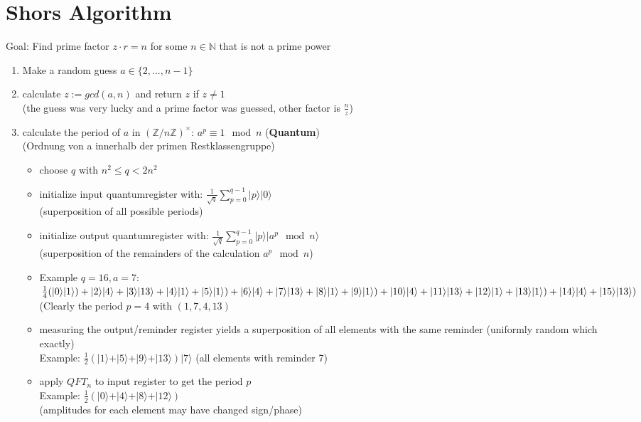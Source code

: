 \documentclass[12pt,a4paper]{article}
\newcommand{\ecb}[1]{\{#1\}}
\newcommand{\ket}[1]{\vert #1 \rangle}
\begin{document}
\section{Shors Algorithm}
Goal: Find prime factor $z \cdot r = n$ for some $n\in\mathbb{N}$ that is not a prime power
\begin{enumerate}
\item Make a random guess $a\in\ecb{2,...,n-1}$
\item calculate $z := gcd(a, n)$ and return $z$ if $z\neq 1$\\(the guess was very lucky and a prime factor was guessed, other factor is $\frac{n}{z}$)
\item calculate the period of $a$ in $(\mathbb{Z}/n\mathbb{Z})^\times$: $a^p \equiv 1 \mod n$ (\textbf{Quantum})\\
(Ordnung von a innerhalb der primen Restklassengruppe)
\begin{itemize}
\item choose $q$ with $n^2 \leq q <2n^2$
\item initialize input quantumregister with: $\displaystyle \frac{1}{\sqrt{q}} \sum_{p=0}^{q-1} \ket{p}\ket{0}$\\
(superposition of all possible periods)
\item initialize output quantumregister with: $\displaystyle \frac{1}{\sqrt{q}} \sum_{p=0}^{q-1} \ket{p}\ket{a^p\mod n}$\\
(superposition of the remainders of the calculation $a^p\mod n$)
\item Example $q=16, a=7$:\\
$\frac{1}{4}(\ket{0}\ket{1})+\ket{2}\ket{4}+\ket{3}\ket{13}+\\
\ket{4}\ket{1}+\ket{5}\ket{1})+\ket{6}\ket{4}+\ket{7}\ket{13}+\\
\ket{8}\ket{1}+\ket{9}\ket{1})+\ket{10}\ket{4}+\ket{11}\ket{13}+\\
\ket{12}\ket{1}+\ket{13}\ket{1})+\ket{14}\ket{4}+\ket{15}\ket{13})$\\
(Clearly the period $p=4$ with $(1,7,4,13)$
\item measuring the output/reminder register yields a superposition of all elements with the same reminder (uniformly random which exactly)\\Example: $\frac{1}{2} (\ket{1}+\ket{5}+\ket{9}+\ket{13})\ket{7}$ (all elements with reminder 7)
\item apply $QFT_n$ to input register to get the period $p$\\
Example: $\frac{1}{2}(\ket{0}+\ket{4}+\ket{8}+\ket{12})$\\(amplitudes for each element may have changed sign/phase)

\end{itemize}
\end{enumerate}
\end{document}
